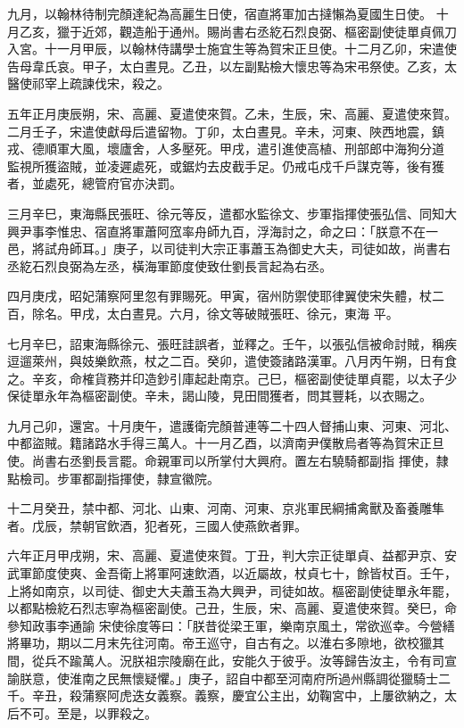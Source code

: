 \begin{pinyinscope}
 九月，以翰林待制完顏達紀為高麗生日使，宿直將軍加古撻懶為夏國生日使。
 十月乙亥，獵于近郊，觀造船于通州。賜尚書右丞紇石烈良弼、樞密副使徒單貞佩刀入宮。十一月甲辰，以翰林侍講學士施宜生等為賀宋正旦使。十二月乙卯，宋遣使告母韋氏哀。甲子，太白晝見。乙丑，以左副點檢大懷忠等為宋弔祭使。乙亥，太醫使祁宰上疏諫伐宋，殺之。



 五年正月庚辰朔，宋、高麗、夏遣使來賀。乙未，生辰，宋、高麗、夏遣使來賀。二月壬子，宋遣使獻母后遣留物。丁卯，太白晝見。辛未，河東、陜西地震，鎮戎、德順軍大風，壞廬舍，人多壓死。甲戌，遣引進使高植、刑部郎中海狗分道
 監視所獲盜賊，並凌遲處死，或鋸灼去皮截手足。仍戒屯戍千戶謀克等，後有獲者，並處死，總管府官亦決罰。



 三月辛巳，東海縣民張旺、徐元等反，遣都水監徐文、步軍指揮使張弘信、同知大興尹事李惟忠、宿直將軍蕭阿窊率舟師九百，浮海討之，命之曰：「朕意不在一邑，將試舟師耳。」庚子，以司徒判大宗正事蕭玉為御史大夫，司徒如故，尚書右丞紇石烈良弼為左丞，橫海軍節度使致仕劉長言起為右丞。



 四月庚戌，昭妃蒲察阿里忽有罪賜死。甲寅，宿州防禦使耶律翼使宋失體，杖二百，除名。甲戌，太白晝見。六月，徐文等破賊張旺、徐元，東海
 平。



 七月辛巳，詔東海縣徐元、張旺詿誤者，並釋之。壬午，以張弘信被命討賊，稱疾逗遛萊州，與妓樂飲燕，杖之二百。癸卯，遣使簽諸路漢軍。八月丙午朔，日有食之。辛亥，命榷貨務并印造鈔引庫起赴南京。己巳，樞密副使徒單貞罷，以太子少保徒單永年為樞密副使。辛未，謁山陵，見田間獲者，問其豐耗，以衣賜之。



 九月己卯，還宮。十月庚午，遣護衛完顏普連等二十四人督捕山東、河東、河北、中都盜賊。籍諸路水手得三萬人。十一月乙酉，以濟南尹僕散烏者等為賀宋正旦使。尚書右丞劉長言罷。命親軍司以所掌付大興府。置左右驍騎都副指
 揮使，隸點檢司。步軍都副指揮使，隸宣徽院。



 十二月癸丑，禁中都、河北、山東、河南、河東、京兆軍民綱捕禽獸及畜養雕隼者。戊辰，禁朝官飲酒，犯者死，三國人使燕飲者罪。



 六年正月甲戌朔，宋、高麗、夏遣使來賀。丁丑，判大宗正徒單貞、益都尹京、安武軍節度使爽、金吾衛上將軍阿速飲酒，以近屬故，杖貞七十，餘皆杖百。壬午，上將如南京，以司徒、御史大夫蕭玉為大興尹，司徒如故。樞密副使徒單永年罷，以都點檢紇石烈志寧為樞密副使。己丑，生辰，宋、高麗、夏遣使來賀。癸巳，命參知政事李通諭
 宋使徐度等曰：「朕昔從梁王軍，樂南京風土，常欲巡幸。今營繕將畢功，期以二月末先往河南。帝王巡守，自古有之。以淮右多隙地，欲校獵其間，從兵不踰萬人。況朕祖宗陵廟在此，安能久于彼乎。汝等歸告汝主，令有司宣諭朕意，使淮南之民無懷疑懼。」庚子，詔自中都至河南府所過州縣調從獵騎士二千。辛丑，殺蒲察阿虎迭女義察。義察，慶宜公主出，幼鞠宮中，上屢欲納之，太后不可。至是，以罪殺之。




\end{pinyinscope}
